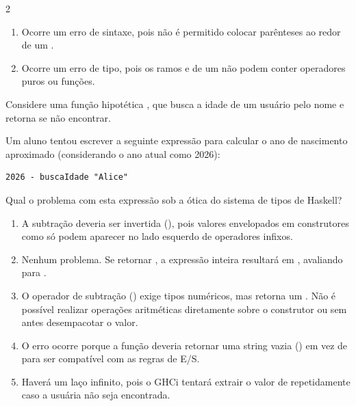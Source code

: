 \documentclass[a4paper,10pt,brazil]{article}
\begin{document}
\begin{multicols}{2}
\begin{enumerate}
  \item Ocorre um erro de sintaxe, pois não é permitido colocar parênteses ao redor de um .

  \item Ocorre um erro de tipo, pois os ramos  e  de um  não podem conter operadores puros ou funções.


\end{enumerate}

Considere uma função hipotética , que busca a idade de um usuário pelo nome e retorna  se não encontrar. 

Um aluno tentou escrever a seguinte expressão para calcular o ano de nascimento aproximado (considerando o ano atual como 2026):
\begin{verbatim}
2026 - buscaIdade "Alice"
\end{verbatim}

Qual o problema com esta expressão sob a ótica do sistema de tipos de Haskell?

\begin{enumerate}
  \item A subtração deveria ser invertida (), pois valores envelopados em construtores como  só podem aparecer no lado esquerdo de operadores infixos.

  \item Nenhum problema. Se  retornar , a expressão inteira resultará em , avaliando para .

  \item O operador de subtração (\haskellinline{-}) exige tipos numéricos, mas  retorna um . Não é possível realizar operações aritméticas diretamente sobre o construtor  ou  sem antes desempacotar o valor.

  \item O erro ocorre porque a função  deveria retornar uma string vazia () em vez de  para ser compatível com as regras de E/S.

  \item Haverá um laço infinito, pois o GHCi tentará extrair o valor de  repetidamente caso a usuária não seja encontrada.



\end{enumerate}
\end{multicols}
\end{document}
